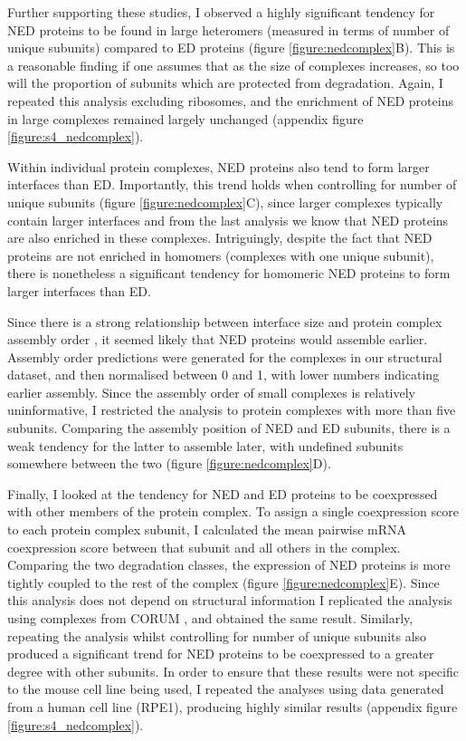 \documentclass[a4paper,11pt,twoside,openright]{scrbook}
\begin{document}
Further supporting these studies, I observed a highly significant tendency for NED proteins to be found in large heteromers (measured in terms of number of unique subunits) compared to ED proteins (figure \ref{figure:nedcomplex}B). This is a reasonable finding if one assumes that as the size of complexes increases, so too will the proportion of subunits which are protected from degradation. Again, I repeated this analysis excluding ribosomes, and the enrichment of NED proteins in large complexes remained largely unchanged (appendix figure \ref{figure:s4_nedcomplex}).

Within individual protein complexes, NED proteins also tend to form larger interfaces than ED. Importantly, this trend holds when controlling for number of unique subunits (figure \ref{figure:nedcomplex}C), since larger complexes typically contain larger interfaces and from the last analysis we know that NED proteins are also enriched in these complexes. Intriguingly, despite the fact that NED proteins are not enriched in homomers (complexes with one unique subunit), there is nonetheless a significant tendency for homomeric NED proteins to form larger interfaces than ED.

Since there is a strong relationship between interface size and protein complex assembly order \cite{Marsh2013}, it seemed likely that NED proteins would assemble earlier. Assembly order predictions were generated for the complexes in our structural dataset, and then normalised between 0 and 1, with lower numbers indicating earlier assembly. Since the assembly order of small complexes is relatively uninformative, I restricted the analysis to protein complexes with more than five subunits. Comparing the assembly position of NED and ED subunits, there is a weak tendency for the latter to assemble later, with undefined subunits somewhere between the two (figure \ref{figure:nedcomplex}D).

Finally, I looked at the tendency for NED and ED proteins to be coexpressed with other members of the protein complex. To assign a single coexpression score to each protein complex subunit, I calculated the mean pairwise mRNA coexpression score between that subunit and all others in the complex. Comparing the two degradation classes, the expression of NED proteins is more tightly coupled to the rest of the complex (figure \ref{figure:nedcomplex}E). Since this analysis does not depend on structural information I replicated the analysis using complexes from CORUM \cite{Ruepp2010}, and obtained the same result. Similarly, repeating the analysis whilst controlling for number of unique subunits also produced a significant trend for NED proteins to be coexpressed to a greater degree with other subunits. In order to ensure that these results were not specific to the mouse cell line being used, I repeated the analyses using data generated from a human cell line (RPE1), producing highly similar results (appendix figure \ref{figure:s4_nedcomplex}).
\end{document}

